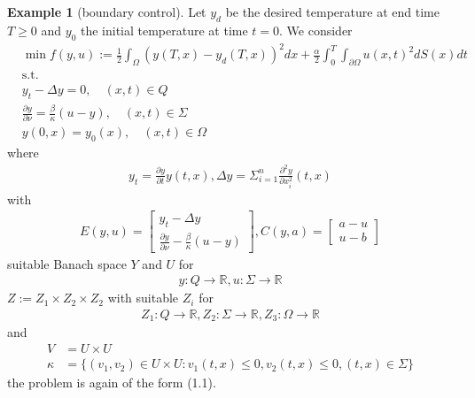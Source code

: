 \documentclass[a4paper,11pt,fleqn]{book}
\theoremstyle{definition}
\newtheorem*{example}{Example}
\theoremstyle{remark}
\begin{document}
\begin{example}[boundary control]
	Let $y_d$ be the desired temperature at end time $T \geq 0$ and $y_0$ the initial temperature at time $t = 0$. We consider 
	\begin{align*}
		&\min f(y, u) := \frac{1}{2} \int_\Omega (y(T, x) - y_d(T, x))^2 dx + \frac{\alpha}{2} \int_0^T \int_{\partial \Omega} u(x, t)^2 dS(x)dt\\
		&\text{s.t.}\\
		&y_t - \Delta y = 0, \quad (x, t) \in   Q\\
		&\frac{\partial y}{\partial \nu} = \frac{\beta}{\kappa}(u - y), \quad  (x, t) \in \Sigma \\
		&y(0, x) = y_0(x), \quad (x, t)\in  \Omega
	\end{align*}
	where
	\begin{align*}
		y_t = \frac{\partial y}{\partial t} y(t, x), \Delta y = \Sigma_{i = 1}^n \frac{\partial^2 y}{\partial x_i^2}(t, x)
	\end{align*}
	with
	\begin{align*}
		E(y, u)= 
		\begin{bmatrix}
			y_t - \Delta y\\
			\frac{\partial y}{\partial \nu} - \frac{\beta}{\kappa} (u - y)
		\end{bmatrix}, C(y, a) = 
		\begin{bmatrix}
			a - u\\
			u - b
		\end{bmatrix}
	\end{align*}
	suitable Banach space $Y$ and $U$ for 
	\begin{align*}
		y: Q \rightarrow \mathbb{R}, u: \Sigma \rightarrow \mathbb{R}
	\end{align*}
	$Z:= Z_1 \times Z_2 \times Z_2$ with suitable $Z_i$ for 
	\begin{align*}
		Z_1: Q \rightarrow \mathbb{R}, Z_2: \Sigma \rightarrow \mathbb{R}, Z_3: \Omega \rightarrow \mathbb{R}
	\end{align*}
	and 
	\begin{align*}
		V &= U \times U\\
		\kappa &= \{(v_1, v_2) \in U \times U: v_1(t, x)\le 0, v_2(t, x) \le 0, (t, x) \in \Sigma \}
	\end{align*}
	the problem is again of the form (1.1). 
\end{example}
\end{document}

